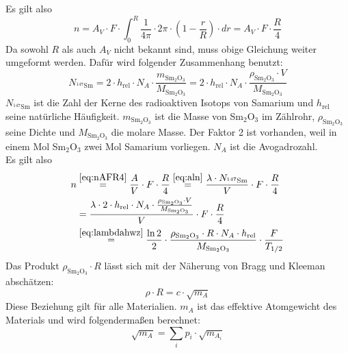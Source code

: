 Es gilt also
\begin{equation}
\label{eq:nAFR4}
  n=A_V \cdot F \cdot \int_{0}^{R}{\frac{1}{4\pi}\cdot 2\pi \cdot (1-\frac{r}{R}) \cdot dr}=
  A_V \cdot F \cdot \frac{R}{4}
\end{equation}
Da sowohl $R$ als auch $A_V$ nicht bekannt sind, muss obige Gleichung weiter umgeformt werden.
Dafür wird folgender Zusammenhang benutzt:
\begin{equation}
  N_{{}^{147}\text{Sm}}=
  2 \cdot h_{\text{rel}} \cdot N_A \cdot \frac{m_{\text{Sm}_2\text{O}_3}}{M_{\text{Sm}_2\text{O}_3}}=
  2 \cdot h_{\text{rel}} \cdot N_A \cdot \frac{\rho_{\text{Sm}_2\text{O}_3} \cdot V}{M_{\text{Sm}_2\text{O}_3}}
\end{equation}
$  N_{{}^{147}\text{Sm}}$ ist die Zahl der Kerne des radioaktiven Isotops von Samarium und
$h_{\text{rel}}$ seine natürliche Häufigkeit. $m_{\text{Sm}_2\text{O}_3}$ ist die Masse von Sm$_2$O$_3$ im Zählrohr,
$\rho_{\text{Sm}_2\text{O}_3}$ seine Dichte und $M_{\text{Sm}_2\text{O}_3}$ die molare Masse.
Der Faktor 2 ist vorhanden, weil in einem Mol Sm$_2$O$_3$ zwei Mol Samarium vorliegen.
$N_A$ ist die Avogadrozahl.\\
Es gilt also
\begin{equation}
\label{eq:samarium:halflife}
\begin{split}
  n & \overset{\ref{eq:nAFR4}}{=}
  \frac{A}{V} \cdot F \cdot \frac{R}{4} \overset{\ref{eq:aln}}{=} \frac{\lambda \cdot N_{{}^{147}\text{Sm}}}{V} \cdot F \cdot \frac{R}{4} \\
  &= \frac{\lambda \cdot 2 \cdot h_{\text{rel}} \cdot N_A \cdot
  \frac{\rho_{\text{Sm}_2\text{O}_3} \cdot V}{M_{\text{Sm}_2\text{O}_3}}}{V} \cdot F \cdot \frac{R}{4} \\
  &\overset{\ref{eq:lambdahwz}}{=} \frac{\ln 2}{2} \cdot \frac{\rho_{\text{Sm}_2\text{O}_3} \cdot R \cdot N_A \cdot h_{\text{rel}}}{M_{\text{Sm}_2\text{O}_3}} 
  \cdot \frac{F}{T_{1/2}}
  \end{split}
\end{equation}
Das Produkt $\rho_{\text{Sm}_2\text{O}_3} \cdot R$ lässt sich mit der Näherung von Bragg und Kleeman abschätzen:
\begin{equation}
  \rho \cdot R = c \cdot \sqrt{m_A}
\end{equation}
Diese Beziehung gilt für alle Materialien. $m_A$ ist das effektive Atomgewicht des Materials
und wird folgendermaßen berechnet:
\begin{equation}
  \sqrt{m_A} = \sum_{i}p_i \cdot \sqrt{m_{A_i}}
\end{equation}
